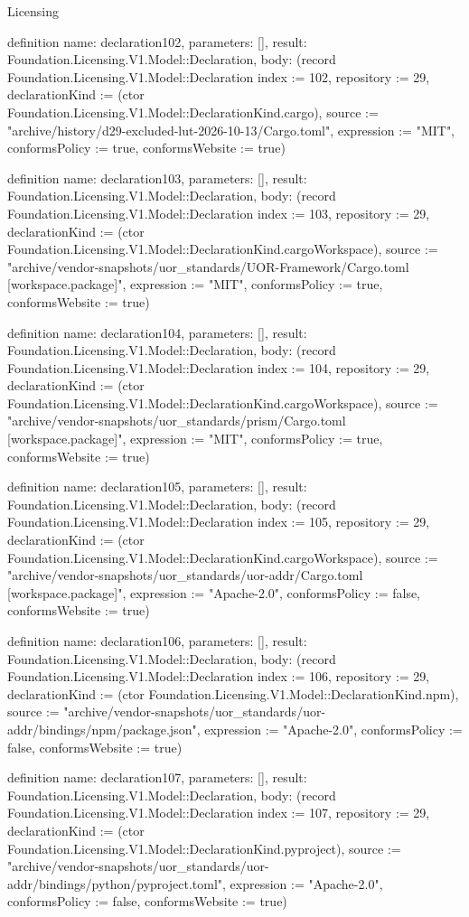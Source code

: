 \begin{lexlean}{Licensing}
\begin{semanticmodule}
definition{
  name: declaration102,
  parameters: [],
  result: Foundation.Licensing.V1.Model::Declaration,
  body: (record Foundation.Licensing.V1.Model::Declaration {index := 102, repository := 29, declarationKind := (ctor Foundation.Licensing.V1.Model::DeclarationKind.cargo), source := "archive/history/d29-excluded-lut-2026-10-13/Cargo.toml", expression := "MIT", conformsPolicy := true, conformsWebsite := true})
}

definition{
  name: declaration103,
  parameters: [],
  result: Foundation.Licensing.V1.Model::Declaration,
  body: (record Foundation.Licensing.V1.Model::Declaration {index := 103, repository := 29, declarationKind := (ctor Foundation.Licensing.V1.Model::DeclarationKind.cargoWorkspace), source := "archive/vendor-snapshots/uor_standards/UOR-Framework/Cargo.toml [workspace.package]", expression := "MIT", conformsPolicy := true, conformsWebsite := true})
}

definition{
  name: declaration104,
  parameters: [],
  result: Foundation.Licensing.V1.Model::Declaration,
  body: (record Foundation.Licensing.V1.Model::Declaration {index := 104, repository := 29, declarationKind := (ctor Foundation.Licensing.V1.Model::DeclarationKind.cargoWorkspace), source := "archive/vendor-snapshots/uor_standards/prism/Cargo.toml [workspace.package]", expression := "MIT", conformsPolicy := true, conformsWebsite := true})
}

definition{
  name: declaration105,
  parameters: [],
  result: Foundation.Licensing.V1.Model::Declaration,
  body: (record Foundation.Licensing.V1.Model::Declaration {index := 105, repository := 29, declarationKind := (ctor Foundation.Licensing.V1.Model::DeclarationKind.cargoWorkspace), source := "archive/vendor-snapshots/uor_standards/uor-addr/Cargo.toml [workspace.package]", expression := "Apache-2.0", conformsPolicy := false, conformsWebsite := true})
}

definition{
  name: declaration106,
  parameters: [],
  result: Foundation.Licensing.V1.Model::Declaration,
  body: (record Foundation.Licensing.V1.Model::Declaration {index := 106, repository := 29, declarationKind := (ctor Foundation.Licensing.V1.Model::DeclarationKind.npm), source := "archive/vendor-snapshots/uor_standards/uor-addr/bindings/npm/package.json", expression := "Apache-2.0", conformsPolicy := false, conformsWebsite := true})
}

definition{
  name: declaration107,
  parameters: [],
  result: Foundation.Licensing.V1.Model::Declaration,
  body: (record Foundation.Licensing.V1.Model::Declaration {index := 107, repository := 29, declarationKind := (ctor Foundation.Licensing.V1.Model::DeclarationKind.pyproject), source := "archive/vendor-snapshots/uor_standards/uor-addr/bindings/python/pyproject.toml", expression := "Apache-2.0", conformsPolicy := false, conformsWebsite := true})
}


\end{semanticmodule}
\end{lexlean}
